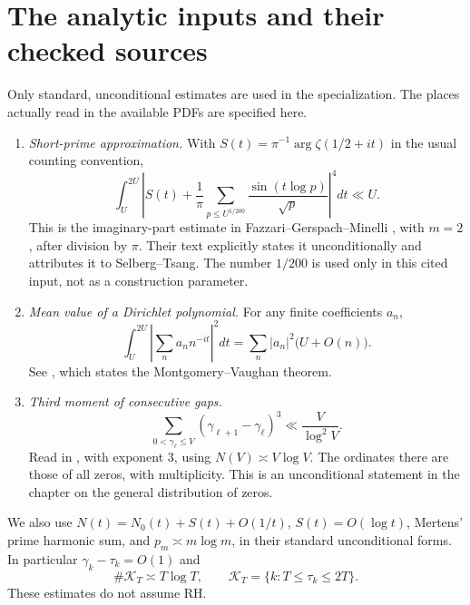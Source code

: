 \documentclass[11pt]{article}
\numberwithin{equation}{section}
\theoremstyle{remark}
\newcommand{\NO}{N_0}
\begin{document}
\section{The analytic inputs and their checked sources}
\label{sec:inputs}
Only standard, unconditional estimates are used in the specialization.
The places actually read in the available PDFs are specified here.

\begin{enumerate}[label=(\roman*),leftmargin=2em]
\item \emph{Short-prime approximation.}
With \(S(t)=\pi^{-1}\arg\zeta(1/2+it)\) in the usual counting convention,
\begin{equation}
 \int_U^{2U}\left|
  S(t)+\frac1\pi\sum_{p\le U^{1/200}}\frac{\sin(t\log p)}{\sqrt p}
 \right|^4dt\ll U.
 \label{eq:selberginput}
\end{equation}
This is the imaginary-part estimate in
Fazzari--Gerspach--Minelli \cite[p.~7, (3.6)]{FGM}, with \(m=2\),
after division by \(\pi\). Their text explicitly states it
unconditionally and attributes it to Selberg--Tsang.
The number \(1/200\) is used only in this cited input, not as a construction
parameter.

\item \emph{Mean value of a Dirichlet polynomial.}
For any finite coefficients \(a_n\),
\begin{equation}
 \int_U^{2U}\left|\sum_n a_n n^{-it}\right|^2dt
 =\sum_n|a_n|^2\bigl(U+O(n)\bigr).
 \label{eq:mvinput}
\end{equation}
See \cite[p.~175, (7.20.1)]{THB}, which states the
Montgomery--Vaughan theorem.

\item \emph{Third moment of consecutive gaps.}
\begin{equation}
 \sum_{0<\gamma_\ell\le V}(\gamma_{\ell+1}-\gamma_\ell)^3
 \ll \frac{V}{\log^2V}.
 \label{eq:gapinput}
\end{equation}
Read in \cite[p.~246, (9.25.4)]{THB}, with exponent \(3\), using
\(N(V)\asymp V\log V\). The ordinates there are those of all zeros,
with multiplicity. This is an unconditional statement in the chapter
on the general distribution of zeros.
\end{enumerate}

We also use \(N(t)=\NO(t)+S(t)+O(1/t)\),
\(S(t)=O(\log t)\), Mertens' prime harmonic sum, and
\(p_m\asymp m\log m\), in their standard unconditional forms.
In particular \(\gamma_k-\tau_k=O(1)\) and
\[
 \#\mathcal K_T\asymp T\log T,\qquad
 \mathcal K_T=\{k:T\le\tau_k\le2T\}.
\]
These estimates do not assume RH.
\end{document}
